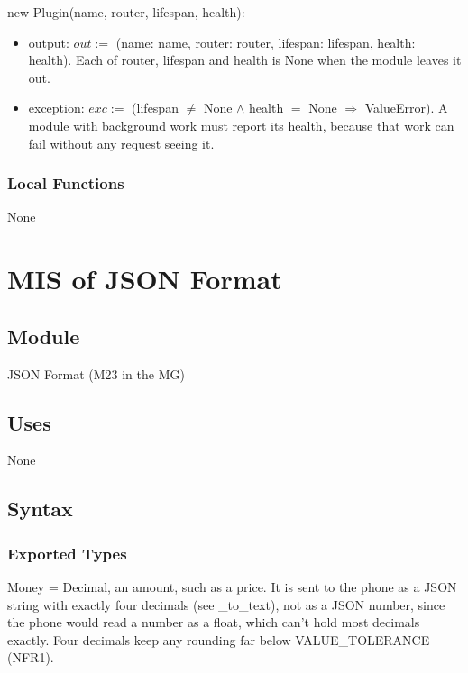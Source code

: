\documentclass[12pt, titlepage]{article}
\begin{document}
\noindent new Plugin(name, router, lifespan, health):
\begin{itemize}
\item output: $out :=$ (name: name, router: router, lifespan: lifespan, health:
  health). Each of router, lifespan and health is None when the module leaves
  it out.
\item exception: $exc :=$ (lifespan $\neq$ None $\land$ health $=$ None
  $\Rightarrow$ ValueError). A module with background work must report its
  health, because that work can fail without any request seeing it.
\end{itemize}

\subsubsection{Local Functions}

None

\newpage

\section{MIS of JSON Format} \label{MisJSON}

\subsection{Module}

JSON Format (M23 in the MG)

\subsection{Uses}

None

\subsection{Syntax}

\subsubsection{Exported Types}

\noindent Money = Decimal, an amount, such as a price. It is sent to the phone
as a JSON string with exactly four decimals (see \_to\_text), not as a JSON
number, since the phone would read a number as a float, which can't hold most
decimals exactly. Four decimals keep any rounding far below
VALUE\_TOLERANCE (NFR1).
\end{document}
